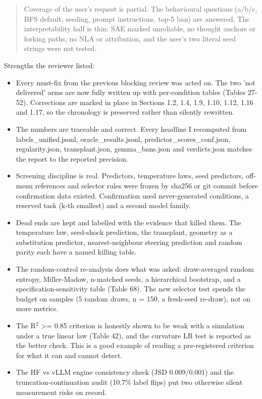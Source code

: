 \documentclass[11pt,letterpaper]{article}
\begin{document}
\begin{quote}
Coverage of the user's request is partial. The behavioural questions (a/b/c, BFS default, seeding, prompt instructions, top-5 ban) are answered. The interpretability half is thin: SAE marked unreliable, no thought anchors or forking paths, no NLA or attribution, and the user's two literal seed strings were not tested.

\end{quote}

Strengths the reviewer listed:

\begin{itemize}\small

\item Every must-fix from the previous blocking review was acted on. The two 'not delivered' arms are now fully written up with per-condition tables (Tables 27-52). Corrections are marked in place in Sections 1.2, 1.4, 1.9, 1.10, 1.12, 1.16 and 1.17, so the chronology is preserved rather than silently rewritten.

\item The numbers are traceable and correct. Every headline I recomputed from labels\_unified.jsonl, oracle\_results.jsonl, predictor\_scores\_conf.json, regularity.json, transplant.json, gemma\_bans.json and verdicts.json matches the report to the reported precision.

\item Screening discipline is real. Predictors, temperature laws, seed predictors, off-menu references and selector rules were frozen by sha256 or git commit before confirmation data existed. Confirmation used never-generated conditions, a reserved task (k-th smallest) and a second model family.

\item Dead ends are kept and labelled with the evidence that killed them. The temperature law, seed-shock prediction, the transplant, geometry as a substitution predictor, nearest-neighbour steering prediction and random parity each have a named killing table.

\item The random-control re-analysis does what was asked: draw-averaged random entropy, Miller-Madow, n-matched seeds, a hierarchical bootstrap, and a specification-sensitivity table (Table 68). The new selector test spends the budget on samples (5 random draws, n = 150, a fresh-seed re-draw), not on more metrics.

\item The R\ensuremath{^2} \textgreater{}= 0.85 criterion is honestly shown to be weak with a simulation under a true linear law (Table 42), and the curvature LR test is reported as the better check. This is a good example of reading a pre-registered criterion for what it can and cannot detect.

\item The HF vs vLLM engine consistency check (JSD 0.009/0.001) and the truncation-continuation audit (10.7\% label flips) put two otherwise silent measurement risks on record.

\end{itemize}
\end{document}
